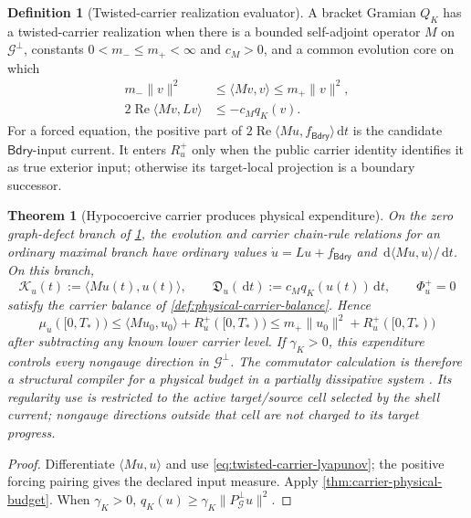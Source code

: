 \documentclass[11pt]{article}
\numberwithin{section}{part}
\theoremstyle{plain}
\newtheorem{theorem}{Theorem}[section]
\theoremstyle{definition}
\newtheorem{definition}[definition]{Definition}
\theoremstyle{remark}
\newcommand{\dd}{\,\mathrm d}
\newcommand{\Bdry}{\mathsf{Bdry}}
\begin{document}
\begin{definition}[Twisted-carrier realization evaluator]
\label{def:twisted-carrier-invariant}
A bracket Gramian \(Q_K\) has a twisted-carrier realization when there is a
bounded self-adjoint operator \(M\) on \(\mathcal G^\perp\), constants
\(0<m_-\le m_+<\infty\) and \(c_M>0\), and a common evolution core on which
\begin{align}
 m_-\|v\|^2&\le\langle Mv,v\rangle\le m_+\|v\|^2,
 \label{eq:twisted-carrier-equivalence}\\
 2\operatorname{Re}\langle Mv,Lv\rangle
 &\le-c_M q_K(v).
 \label{eq:twisted-carrier-lyapunov}
\end{align}
For a forced equation, the positive part of
\(2\operatorname{Re}\langle Mu,f_{\Bdry}\rangle\dd t\) is the candidate
\(\Bdry\)-input current.  It enters \(R_u^+\) only when the public carrier
identity identifies it as true exterior input; otherwise its target-local
projection is a boundary successor.
\end{definition}

\begin{theorem}[Hypocoercive carrier produces physical expenditure]
\label{thm:hypocoercive-carrier-budget}
On the zero graph-defect branch of
\cref{def:twisted-carrier-invariant}, the evolution and carrier chain-rule
relations for an ordinary maximal branch have ordinary values
\(\dot u=Lu+f_{\Bdry}\) and \(\dd\langle Mu,u\rangle/\dd t\).  On this branch,
\[
 \mathcal K_u(t):=\langle Mu(t),u(t)\rangle,
 \qquad
 \mathfrak D_u(\dd t):=c_Mq_K(u(t))\dd t,
 \qquad
 \Phi_u^+=0
\]
satisfy the carrier balance of
\cref{def:physical-carrier-balance}.  Hence
\begin{equation}
 \label{eq:hypocoercive-physical-budget}
 \mu_u([0,T_*))
 \le \langle Mu_0,u_0\rangle+R_u^+([0,T_*))
 \le m_+\|u_0\|^2+R_u^+([0,T_*))
\end{equation}
after subtracting any known lower carrier level.  If \(\gamma_K>0\), this
expenditure controls every nongauge direction in \(\mathcal G^\perp\).
The commutator calculation is therefore a structural compiler for a physical
budget in a partially dissipative system \citep{Villani2009}.  Its
regularity use is restricted to the active target/source cell selected by the
shell current; nongauge directions outside that cell are not charged to its
target progress.
\end{theorem}

\begin{proof}
Differentiate \(\langle Mu,u\rangle\) and use
\eqref{eq:twisted-carrier-lyapunov}; the positive forcing pairing gives the
declared input measure.  Apply
\cref{thm:carrier-physical-budget}.  When \(\gamma_K>0\),
\(q_K(u)\ge\gamma_K\|P_{\mathcal G}^\perp u\|^2\).
\end{proof}
\end{document}
